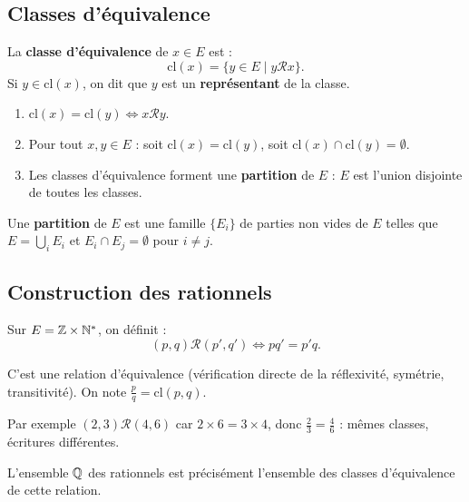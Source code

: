 \subsection{Classes d'équivalence}

\begin{defbox}
La \textbf{classe d'équivalence} de $x \in E$ est :
\[\mathrm{cl}(x) = \{y \in E \mid y \mathcal{R} x\}.\]
Si $y \in \mathrm{cl}(x)$, on dit que $y$ est un \textbf{représentant} de la classe.
\end{defbox}

\begin{propbox}
\begin{enumerate}[leftmargin=1.5cm]
  \item $\mathrm{cl}(x) = \mathrm{cl}(y) \iff x \mathcal{R} y$.
  \item Pour tout $x, y \in E$ : soit $\mathrm{cl}(x) = \mathrm{cl}(y)$, soit $\mathrm{cl}(x) \cap \mathrm{cl}(y) = \emptyset$.
  \item Les classes d'équivalence forment une \textbf{partition} de $E$ : $E$ est l'union disjointe de toutes les classes.
\end{enumerate}
\end{propbox}

\begin{rembox}
Une \textbf{partition} de $E$ est une famille $\{E_i\}$ de parties non vides de $E$ telles que $E = \bigcup_i E_i$ et $E_i \cap E_j = \emptyset$ pour $i \neq j$.
\end{rembox}


\subsection{Construction des rationnels}

\begin{exbox}
Sur $E = \mathbb{Z} \times \mathbb{N}^*$, on définit :
\[(p, q) \mathcal{R} (p', q') \iff pq' = p'q.\]

C'est une relation d'équivalence (vérification directe de la réflexivité, symétrie, transitivité). On note $\frac{p}{q} = \mathrm{cl}(p, q)$.

Par exemple $(2, 3) \mathcal{R} (4, 6)$ car $2 \times 6 = 3 \times 4$, donc $\frac{2}{3} = \frac{4}{6}$ : mêmes classes, écritures différentes.

L'ensemble $\mathbb{Q}$ des rationnels est précisément l'ensemble des classes d'équivalence de cette relation.
\end{exbox}

